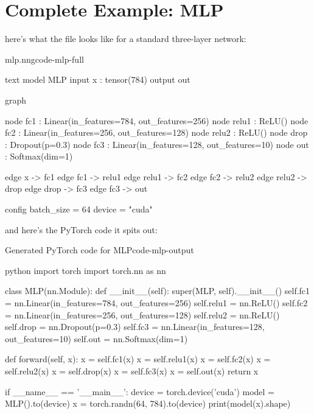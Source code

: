 \documentclass{nngraph-en}
\begin{document}
\section{Complete Example: MLP}

here's what the  file looks like for a standard three-layer network:

\begin{codebox}{mlp.nng}{code-mlp-full}
\begin{amzcode}{text}
model MLP {
    input  x   : tensor(784)
    output out
}

graph {
    node fc1   : Linear(in_features=784, out_features=256)
    node relu1 : ReLU()
    node fc2   : Linear(in_features=256, out_features=128)
    node relu2 : ReLU()
    node drop  : Dropout(p=0.3)
    node fc3   : Linear(in_features=128, out_features=10)
    node out   : Softmax(dim=1)

    edge x     -> fc1
    edge fc1   -> relu1
    edge relu1 -> fc2
    edge fc2   -> relu2
    edge relu2 -> drop
    edge drop  -> fc3
    edge fc3   -> out
}

config {
    batch_size = 64
    device = "cuda"
}
\end{amzcode}
\end{codebox}

and here's the PyTorch code it spits out:

\begin{codebox}{Generated PyTorch code for MLP}{code-mlp-output}
\begin{amzcode}{python}
import torch
import torch.nn as nn


class MLP(nn.Module):
    def __init__(self):
        super(MLP, self).__init__()
        self.fc1   = nn.Linear(in_features=784, out_features=256)
        self.relu1 = nn.ReLU()
        self.fc2   = nn.Linear(in_features=256, out_features=128)
        self.relu2 = nn.ReLU()
        self.drop  = nn.Dropout(p=0.3)
        self.fc3   = nn.Linear(in_features=128, out_features=10)
        self.out   = nn.Softmax(dim=1)

    def forward(self, x):
        x = self.fc1(x)
        x = self.relu1(x)
        x = self.fc2(x)
        x = self.relu2(x)
        x = self.drop(x)
        x = self.fc3(x)
        x = self.out(x)
        return x


if __name__ == '__main__':
    device = torch.device('cuda')
    model  = MLP().to(device)
    x      = torch.randn(64, 784).to(device)
    print(model(x).shape)
\end{amzcode}
\end{codebox}
\end{document}
